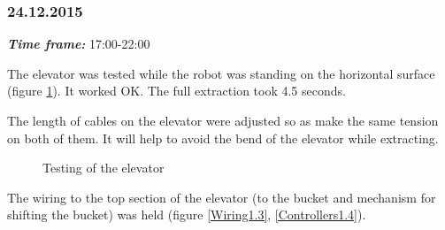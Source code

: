\subsubsection{24.12.2015}
\textit{\textbf{Time frame:}} 17:00-22:00 

The elevator was tested while the robot was standing on the horizontal surface (figure \ref{Elevator2.5}). It worked OK. The full extraction took 4.5 seconds.

The length of cables on the elevator were adjusted so as make the same tension on both of them. It will help to avoid the bend of the elevator while extracting.

\begin{figure}[H]
	\begin{minipage}[h]{1\linewidth}
		\caption{Testing of the elevator}
		\label{Elevator2.5}
	\end{minipage}
\end{figure}

The wiring to the top section of the elevator (to the bucket and mechanism for shifting the bucket) was held (figure \ref{Wiring1.3}, \ref{Controllers1.4}).

